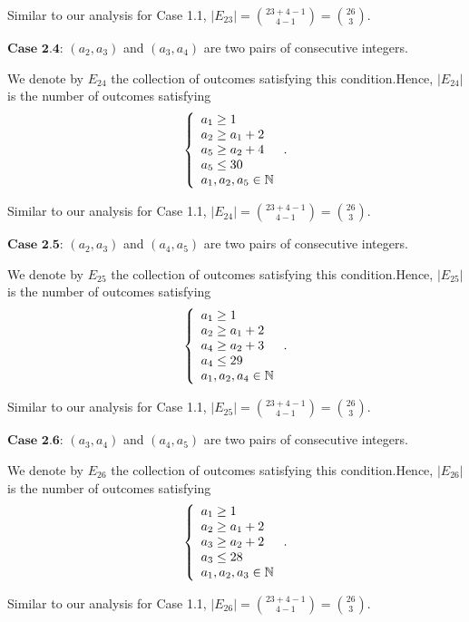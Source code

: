\begin{enumerate}
 Similar to our analysis for Case 1.1,  $| E_{23} | = \binom{23 + 4 - 1}{4 - 1} = \binom{26}{3}$.

 $\textbf{Case 2.4}$: $\left( a_2 , a_3 \right)$ and $\left( a_3 , a_4 \right)$ are two pairs of consecutive integers.

 We denote by $E_{24}$ the collection of outcomes satisfying this condition.Hence, $| E_{24} |$ is the number of outcomes satisfying
 \[ \left\{ \begin{array}{l} a_1 \geq 1 \\ a_2 \geq a_1 + 2 \\ a_5 \geq a_2 + 4 \\ a_5 \leq 30 \\ a_1, a_2, a_5 \in \Bbb N \end{array} \right.. \]

 Similar to our analysis for Case 1.1,  $| E_{24} | = \binom{23 + 4 - 1}{4 - 1} = \binom{26}{3}$.

 $\textbf{Case 2.5}$: $\left( a_2 , a_3 \right)$ and $\left( a_4 , a_5 \right)$ are two pairs of consecutive integers.

 We denote by $E_{25}$ the collection of outcomes satisfying this condition.Hence, $| E_{25} |$ is the number of outcomes satisfying
 \[ \left\{ \begin{array}{l} a_1 \geq 1 \\ a_2 \geq a_1 + 2 \\ a_4 \geq a_2 + 3 \\ a_4 \leq 29 \\ a_1, a_2, a_4 \in \Bbb N \end{array} \right.. \]

 Similar to our analysis for Case 1.1,  $| E_{25} | = \binom{23 + 4 - 1}{4 - 1} = \binom{26}{3}$.

 $\textbf{Case 2.6}$: $\left( a_3 , a_4 \right)$ and $\left( a_4 , a_5 \right)$ are two pairs of consecutive integers.

 We denote by $E_{26}$ the collection of outcomes satisfying this condition.Hence, $| E_{26} |$ is the number of outcomes satisfying
 \[ \left\{ \begin{array}{l} a_1 \geq 1 \\ a_2 \geq a_1 + 2 \\ a_3 \geq a_2 + 2 \\ a_3 \leq 28 \\ a_1, a_2, a_3 \in \Bbb N \end{array} \right.. \]

 Similar to our analysis for Case 1.1,  $| E_{26} | = \binom{23 + 4 - 1}{4 - 1} = \binom{26}{3}$.


\end{enumerate}
